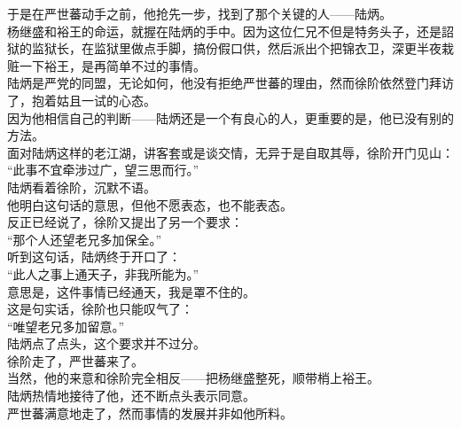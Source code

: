 \begin{multicols}{\theparacolNo}
于是在严世蕃动手之前，他抢先一步，找到了那个关键的人——陆炳。\\

杨继盛和裕王的命运，就握在陆炳的手中。因为这位仁兄不但是特务头子，还是詔狱的监狱长，在监狱里做点手脚，搞份假口供，然后派出个把锦衣卫，深更半夜栽赃一下裕王，是再简单不过的事情。\\

陆炳是严党的同盟，无论如何，他没有拒绝严世蕃的理由，然而徐阶依然登门拜访了，抱着姑且一试的心态。\\

因为他相信自己的判断——陆炳还是一个有良心的人，更重要的是，他已没有别的方法。\\

面对陆炳这样的老江湖，讲客套或是谈交情，无异于是自取其辱，徐阶开门见山：\\

“此事不宜牵涉过广，望三思而行。”\\

陆炳看着徐阶，沉默不语。\\

他明白这句话的意思，但他不愿表态，也不能表态。\\

反正已经说了，徐阶又提出了另一个要求：\\

“那个人还望老兄多加保全。”\\

听到这句话，陆炳终于开口了：\\

“此人之事上通天子，非我所能为。”\\

意思是，这件事情已经通天，我是罩不住的。\\

这是句实话，徐阶也只能叹气了：\\

“唯望老兄多加留意。”\\

陆炳点了点头，这个要求并不过分。\\

徐阶走了，严世蕃来了。\\

当然，他的来意和徐阶完全相反——把杨继盛整死，顺带梢上裕王。\\

陆炳热情地接待了他，还不断点头表示同意。\\

严世蕃满意地走了，然而事情的发展并非如他所料。\\


\end{multicols}
